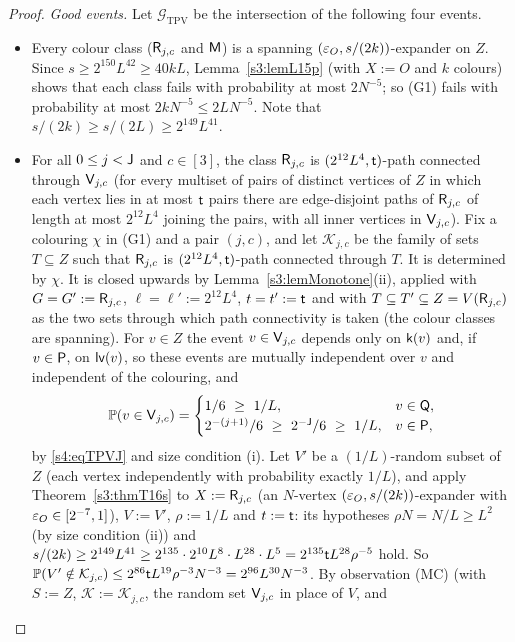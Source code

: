 \begin{proof}
\emph{Good events.} Let $\mathcal G_{\mathrm{TPV}}$ be the intersection of the following four events.
\begin{itemize}
\item[(G1)] Every colour class ($\mathsf{R}_{j,c}$ and $\mathsf{M}$) is a spanning $(\varepsilon_O,s/(2k))$-expander on $Z$. Since
  $s\ge2^{150}L^{42}\ge40kL$, Lemma~\ref{s3:lemL15p} (with $X:=O$ and $k$ colours) shows that each class fails with
  probability at most $2N^{-5}$; so (G1) fails with probability at most $2kN^{-5}\le2LN^{-5}$. Note that
  $s/(2k)\ge s/(2L)\ge2^{149}L^{41}$.
\item[(G2)] For all $0\le j<\mathsf{J}$ and $c\in[3]$, the class $\mathsf{R}_{j,c}$ is $(2^{12}L^4,\mathsf{t})$-path connected through
  $\mathsf{V}_{j,c}$ (for every multiset of pairs of distinct vertices of $Z$ in which each vertex lies in at most $\mathsf{t}$
  pairs there are edge-disjoint paths of $\mathsf{R}_{j,c}$ of length at most $2^{12}L^4$ joining the pairs, with all inner
  vertices in $\mathsf{V}_{j,c}$). Fix a colouring $\chi$ in (G1) and a pair $(j,c)$, and let $\mathcal K_{j,c}$ be the
  family of sets $T\subseteq Z$ such that $\mathsf{R}_{j,c}$ is $(2^{12}L^4,\mathsf{t})$-path connected through $T$. It is
  determined by $\chi$. It is closed upwards by Lemma~\ref{s3:lemMonotone}(ii), applied with $G=G':=\mathsf{R}_{j,c}$,
  $\ell=\ell':=2^{12}L^4$, $t=t':=\mathsf{t}$ and with $T\subseteq T'\subseteq Z=V(\mathsf{R}_{j,c})$ as the two sets through
  which path connectivity is taken (the colour classes are spanning). For $v\in Z$ the event $v\in\mathsf{V}_{j,c}$
  depends only on $\mathsf{k}(v)$ and, if $v\in\mathsf{P}$, on $\mathsf{lv}(v)$, so these events are mutually independent over $v$
  and independent of the colouring, and
  \[
  \Prob(v\in\vV_{j,c})=\begin{cases}1/6\ \ge\ 1/L,& v\in\vQ,\\ 2^{-(j+1)}/6\ \ge\ 2^{-\vJ}/6\ \ge\ 1/L,& v\in\vP,\end{cases}
  \]
  by \eqref{s4:eqTPVJ} and size condition (i). Let $V'$ be a $(1/L)$-random subset of $Z$ (each vertex independently
  with probability exactly $1/L$), and apply Theorem~\ref{s3:thmT16s} to $X:=\mathsf{R}_{j,c}$ (an $N$-vertex
  $(\varepsilon_O,s/(2k))$-expander with $\varepsilon_O\in[2^{-7},1]$), $V:=V'$, $\rho:=1/L$ and $t:=\mathsf{t}$: its hypotheses
  $\rho N=N/L\ge L^2$ (by size condition (ii)) and
  $s/(2k)\ge2^{149}L^{41}\ge2^{135}\cdot2^{10}L^8\cdot L^{28}\cdot L^{5}=2^{135}\mathsf{t} L^{28}\rho^{-5}$ hold. So
  $\mathbb{P}(V'\notin\mathcal K_{j,c})\le2^{86}\mathsf{t} L^{19}\rho^{-3}N^{-3}=2^{96}L^{30}N^{-3}$. By observation
  \textup{(MC)} (with $S:=Z$, $\mathcal K:=\mathcal K_{j,c}$, the random set $\mathsf{V}_{j,c}$ in place of $V$, and

\end{itemize}
\end{proof}
